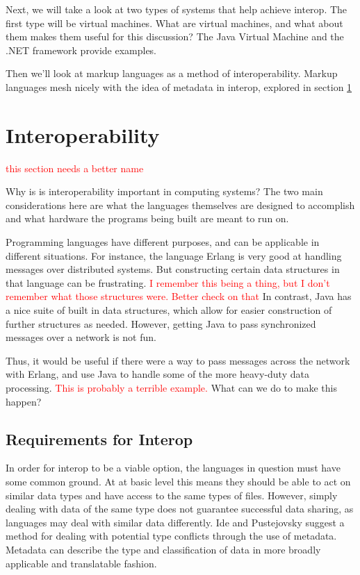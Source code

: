 \documentclass{sig-alternate}
\newcommand{\mycomment}[1]{\textcolor{red}{#1}}
\begin{document}
Next, we will take a look at two types of systems that help achieve interop. The first type will be virtual machines. What are virtual machines, and what about them makes them useful for this discussion? The Java Virtual Machine and the .NET framework provide examples.

Then we'll look at markup languages as a method of interoperability. Markup languages mesh nicely with the idea of metadata in interop, explored in section \ref{difficulties}

\section{Interoperability}\label{difficulties}
\mycomment{this section needs a better name}

Why is is interoperability important in computing systems? The two main considerations here are what the languages themselves are designed to accomplish and what hardware the programs being built are meant to run on.

Programming languages have different purposes, and can be applicable in different situations. For instance, the language Erlang is very good at handling messages over distributed systems. But constructing certain data structures in that language can be frustrating. \mycomment{I remember this being a thing, but I don't remember what those structures were. Better check on that} 
In contrast, Java has a nice suite of built in data structures, which allow for easier construction of further structures as needed. However, getting Java to pass synchronized messages over a network is not fun.

Thus, it would be useful if there were a way to pass messages across the network with Erlang, and use Java to handle some of the more heavy-duty data processing. \mycomment{This is probably a terrible example.}
What can we do to make this happen?

\subsection*{Requirements for Interop}
In order for interop to be a viable option, the languages in question must have some common ground. At at basic level
this means they should be able to act on similar data types and have access to the same types of files. However, simply dealing with data of the same type does not guarantee successful data sharing, as languages may deal with similar data differently. Ide and Pustejovsky \cite{Ide:2010} suggest a method for dealing with potential type conflicts through the use of metadata. Metadata can describe the type and classification of data in more broadly applicable and translatable fashion.
\end{document}
